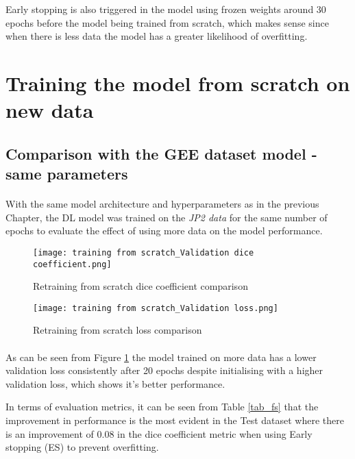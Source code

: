Early stopping is also triggered in the model using frozen weights around 30 epochs before the model being trained from scratch, which makes sense since when there is less data the model has a greater likelihood of overfitting.

\section{Training the model from scratch on new data} \label{new_data_fs}
\subsection{Comparison with the GEE dataset model - same parameters}
\paragraph{}
With the same model architecture and hyperparameters as in the previous Chapter, the DL model was trained on the \textit{JP2 data} for the same number of epochs to evaluate the effect of using more data on the model performance.

\begin{figure}[hbt!]
    \begin{minipage}[c]{0.45\linewidth}
        \texttt{[image: training from scratch\_Validation dice coefficient.png]}
        \caption{Retraining from scratch dice coefficient comparison}
        \label{fs_dice}
        \end{minipage}
        \hfill
    \begin{minipage}[c]{0.45\linewidth}
        \texttt{[image: training from scratch\_Validation loss.png]}
        \caption{Retraining from scratch loss comparison}
        \label{fs_loss}
    \end{minipage}
\end{figure}
\paragraph{}
As can be seen from Figure \ref{fs_loss} the model trained on more data has a lower validation loss consistently after 20 epochs despite initialising with a higher validation loss, which shows it's better performance. 

In terms of evaluation metrics, it can be seen from Table \ref{tab_fs} that the improvement in performance is the most evident in the Test dataset where there is an improvement of 0.08 in the dice coefficient metric when using Early stopping (ES) to prevent overfitting.

